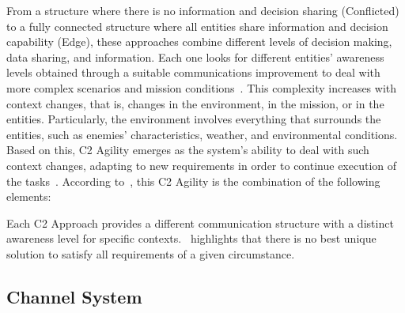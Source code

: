 From a structure where there is no information and decision sharing (Conflicted) to a fully connected structure where all entities share information and decision capability (Edge), these approaches combine different levels of decision making, data sharing, and information. Each one looks for different entities' awareness levels obtained through a suitable communications improvement to deal with more complex scenarios and mission conditions~\citep{nato01,Power01}. \color{black}This complexity increases with context changes, that is, changes in the environment, in the mission, or in the entities. Particularly, the environment involves everything that surrounds the entities, such as  enemies' characteristics, weather, and environmental conditions\color{black}. Based on this, C2 Agility emerges as the system's ability to deal with such context changes, \color{black}adapting to new requirements in order to continue execution of the tasks\color{black}~\citep{FRANCE2014}. According to~\citet{Alberts2006}, this C2 Agility is the combination of the following elements:

\begin{center}
\end{center}

Each C2 Approach provides a different communication structure with a distinct awareness level  for specific contexts.~\citet{nato01} highlights that there is no best unique solution to satisfy all requirements of a given circumstance.



\subsection{Channel System}
\label{ssec:background_cs}


